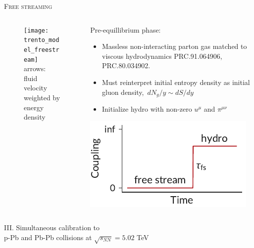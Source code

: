 \documentclass[aspectratio=169]{beamer}
\newcommand{\sqrts}{\sqrt{s_{NN}}}
\begin{document}
\begin{frame}[t]{\scshape Free streaming}
  \begin{columns}[T]
    \begin{column}{.5\textwidth}
      \begin{figure}
        \texttt{[image: trento\_model\_freestream]}\\
        \small arrows: fluid velocity\\weighted by energy density
      \end{figure}
    \end{column}
    \begin{column}{.5\textwidth}
      \bigskip \centering
      \textcolor{theme}{Pre-equillibrium phase:}
      \begin{itemize}
        \small
        \item Massless non-interacting parton gas matched to viscous hydrodynamics
          \textcolor{theme}{\scriptsize PRC.91.064906, PRC.80.034902}.
        \item Must reinterpret initial entropy density as initial gluon density,\,
          $dN_g/y \sim dS/dy$
        \item Initialize hydro with non-zero $u^\mu$ and $\pi^{\mu\nu}$
      \end{itemize}
      \medskip
      \includegraphics{coupling}
    \end{column}
  \end{columns}
\end{frame}

\begin{frame}
  \begin{center}
    \Large III. Simultaneous calibration to\\
    p-Pb and Pb-Pb collisions at $\sqrts=5.02$ TeV
  \end{center}
\end{frame}
\end{document}
